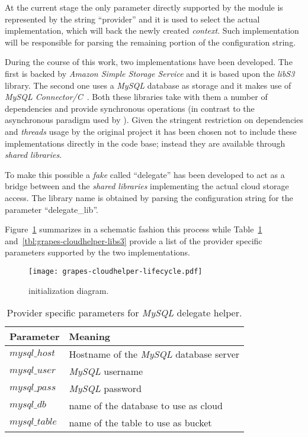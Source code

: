 At the current stage the only parameter directly supported by the
\cloudhelper module is represented by the string ``provider''
and it is used to select the actual implementation, which will back the
newly created \textit{context}. Such implementation will be
responsible for parsing the remaining portion of the configuration
string.

During the course of this work, two \cloudhelper implementations have been
developed. The first is backed by \textit{Amazon Simple Storage
  Service}  and it is based upon the \textit{libS3}~\cite{LibS3} library. The
second one uses a \textit{MySQL} database as storage and it
makes use of \textit{MySQL Connector/C}~\cite{MySQLConnectorC}. Both
these libraries take with them a number of dependencies and provide
synchronous operations (in contrast to the asynchronous paradigm used
by \grapes). Given the stringent restriction on dependencies and
\textit{threads} usage by the original project it has been chosen not to
include these \cloudhelper implementations directly in the code
base; instead they are available through \textit{shared libraries}.

To make this possible a \textit{fake} \cloudhelper called ``delegate''
has been developed to act as a bridge between \grapes and the \textit{shared
  libraries} implementing the actual cloud storage access. The
library name is obtained by parsing the configuration string for the parameter
``delegate\_lib''.

Figure~\ref{fig:grapes-cloudhelper-lifecycle} summarizes in a schematic
fashion this process while Table~\ref{tbl:grapes-cloudhelper-mysql}
and~\ref{tbl:grapes-cloudhelper-libs3} provide a list of the provider
specific parameters supported by the two implementations.

\begin{figure}[H]
  \centering
  \texttt{[image: grapes-cloudhelper-lifecycle.pdf]}
  \caption{\cloudhelper initialization diagram.}
  \label{fig:grapes-cloudhelper-lifecycle}
\end{figure}

\begin{table}[H]
  \centering
  \begin{tabular}{|l|l|}
  \hline
  Parameter & Meaning \\
  \hline
  \hline
  $mysql\_host$ & Hostname of the \textit{MySQL} database server \\
  $mysql\_user$ & \textit{MySQL} username \\
  $mysql\_pass$ & \textit{MySQL} password \\
  $mysql\_db$ & name of the database to use as cloud \\
  $mysql\_table$ & name of the table to use as bucket \\
  \hline
  \end{tabular}
  \caption{Provider specific parameters for \textit{MySQL} delegate helper.}
  \label{tbl:grapes-cloudhelper-mysql}
\end{table}

